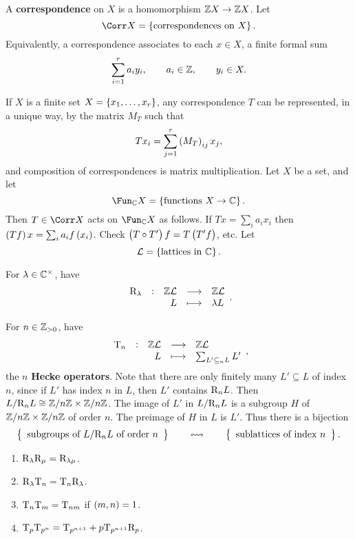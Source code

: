 \begin{definition}
A \textbf{correspondence} on $ X $ is a homomorphism $ \mathbb{Z} X \to \mathbb{Z} X $. Let
$$ \Corr X = \cbr{\text{correspondences on} \ X}. $$
Equivalently, a correspondence associates to each $ x \in X $, a finite formal sum
$$ \sum_{i = 1}^r a_iy_i, \qquad a_i \in \mathbb{Z}, \qquad y_i \in X. $$
\end{definition}

If $ X $ is a finite set $ X = \cbr{x_1, \dots, x_r} $, any correspondence $ T $ can be represented, in a unique way, by the matrix $ M_T $ such that
$$ Tx_i = \sum_{j = 1}^r \br{M_T}_{ij}x_j, $$
and composition of correspondences is matrix multiplication. Let $ X $ be a set, and let
$$ \Fun_\CC X = \cbr{\text{functions} \ X \to \CC}. $$
Then $ T \in \Corr X $ acts on $ \Fun_\CC X $ as follows. If $ Tx = \sum_i a_ix_i $ then $ \br{Tf}x = \sum_i a_if\br{x_i} $. Check $ \br{T \circ T'}f = T\br{T'f} $, etc. Let
$$ \LLL = \cbr{\text{lattices in} \ \CC}. $$

\pagebreak

\begin{example*}
For $ \lambda \in \mathbb{C}^\times $, have
$$ \function[\R_\lambda]{\ZZ\LLL}{\ZZ\LLL}{L}{\lambda L}. $$
\end{example*}

\begin{example*}
For $ n \in \mathbb{Z}_{> 0} $, have
$$ \function[\T_n]{\ZZ\LLL}{\ZZ\LLL}{L}{\sum_{L' \subseteq_n L} L'}, $$
the $ n $ \textbf{Hecke operators}. Note that there are only finitely many $ L' \subseteq L $ of index $ n $, since if $ L' $ has index $ n $ in $ L $, then $ L' $ contains $ \mathrm{R}_nL $. Then $ L / \mathrm{R}_nL \cong \mathbb{Z} / n\mathbb{Z} \times \mathbb{Z} / n\mathbb{Z} $. The image of $ L' $ in $ L / \mathrm{R}_nL $ is a subgroup $ H $ of $ \mathbb{Z} / n\mathbb{Z} \times \mathbb{Z} / n\mathbb{Z} $ of order $ n $. The preimage of $ H $ in $ L $ is $ L' $. Thus there is a bijection
$$ \correspondence{\text{subgroups of} \ L / \R_nL \ \text{of order} \ n}{\text{sublattices of index} \ n}. $$
\end{example*}

\begin{proposition}
\label{prop:correspondence}
\hfill
\begin{enumerate}
\item $ \mathrm{R}_\lambda\mathrm{R}_\mu = \mathrm{R}_{\lambda\mu} $.
\item $ \mathrm{R}_\lambda\mathrm{T}_n = \mathrm{T}_n\mathrm{R}_\lambda $.
\item $ \mathrm{T}_n\mathrm{T}_m = \mathrm{T}_{nm} $ if $ \br{m, n} = 1 $.
\item $ \mathrm{T}_p\mathrm{T}_{p^n} = \mathrm{T}_{p^{n + 1}} + p\mathrm{T}_{p^{n + 1}}\mathrm{R}_p $.
\end{enumerate}
\end{proposition}


